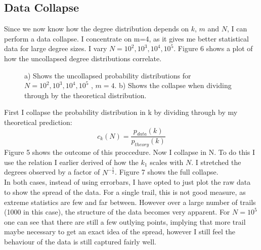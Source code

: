\documentclass[]{article}
\begin{document}
\subsection{Data Collapse}
Since we now know how the degree distribution depends on $k$, $m$ and $N$, I can perform a data collapse. I concentrate on m=4, as it gives me better statistical data for large degree sizes. I vary $N=10^2, 10^3, 10^4, 10^5$. Figure 6 shows a plot of how the uncollapsed degree distributions correlate. 
\begin{figure}[H]
		\baselineskip
				\caption{a) Shows the uncollapsed probability distributions for $N=10^2,10^3,10^4,10^5$ , $m=4$. b) Shows the collapse when dividing through by the theoretical distribution.  }
\end{figure} 
First I collapse the probability distribution in k by dividing through by my theoretical prediction:
\begin{equation}
	c_k(N)=\frac{p_{data}(k)}{p_{theory}(k)}
\end{equation}
Figure 5 shows the outcome of this proccedure.
Now I collapse in N. To do this I use the relation I earlier derived of how the $k_1$ scales with $N$. I stretched the degrees observed by a factor of $N^{-\frac{1}{2}}$. Figure 7 shows the full collapse.\\
In both cases, instead of using errorbars, I have opted to just plot the raw data to show the spread of the data. For a single trail, this is not good measure, as extreme statistics are few and far between. However over a large number of trails (1000 in this case), the structure of the data becomes very apparent. For $N=10^5$ one can see that there are still a few outlying points, implying that more trail maybe necessary to get an exact idea of the spread, however I still feel the behaviour of the data is still captured fairly well.
\end{document}
